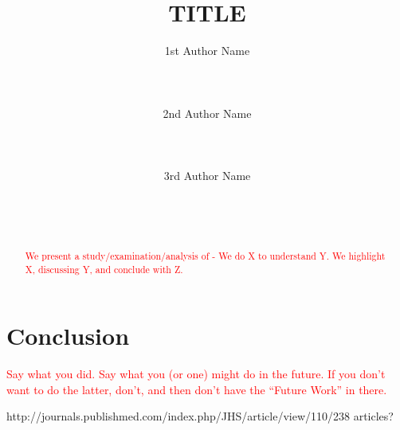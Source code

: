 \documentclass{sigchi}
\begin{document}
\title{TITLE}

\author{
  \alignauthor 1st Author Name\\
    \\
    \\
    \\
  \alignauthor 2nd Author Name\\
    \\
    \\
    \\
  \alignauthor 3rd Author Name\\
    \\
    \\
    \\
}

\maketitle

\begin{abstract}
\begin{comment}
You should write an abstract early on, knowing fully well that you will (and should) iterate through it at least 3-4 times. It is also the thing you should edit again just before you submit.
\end{comment}
\textcolor{red}{We present a study/examination/analysis of - We do X to understand Y. We highlight X, discussing Y, and conclude with Z.
}
\end{abstract}










\section{Conclusion}
\textcolor{red}{Say what you did. Say what you (or one) might do in the future. If you don’t want to do the latter, don’t, and then don’t have the “Future Work” in there. }

\balance



http://journals.publishmed.com/index.php/JHS/article/view/110/238
articles?
\end{document}
